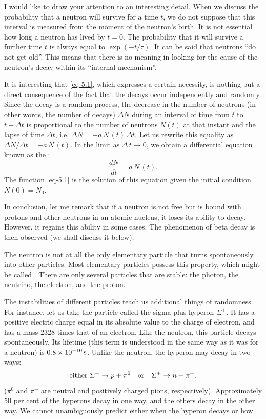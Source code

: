 I would like to draw your attention to an interesting detail. When we
discuss the probability that a neutron will survive for a time $t$, we do
not suppose that this interval is measured from the moment of the
neutron's birth. It is not essential how long a neutron has lived by $t = 0$.
The probability that it will survive a further time $t$ is always equal to
$\exp  (-t / \tau)$. It can be said that neutrons ``do not get old''. This means that there is no meaning in looking for the cause of the neutron's decay
within its ``internal mechanism''.

It is interesting that \eqref{eq-5.1}, which expresses a certain necessity, is
nothing but a direct consequence of the fact that the decays occur
independently and randomly. Since the decay is a random process, the
decrease in the number of neutrons (in other words, the number of
decays) $\Delta N$ during an interval of time from $t$ to $t + \Delta t$ is proportional to the number of neutrons $N (t)$ at that instant and the lapse of time $\Delta t$, i.e. $ \Delta N = - a \, N \, (t) \, \Delta t$. Let us rewrite this equality as   $ \Delta N / \Delta t  = - a \, N \, (t)$. In the
limit as $ \Delta \, t \to 0$, we obtain a differential equation known as the :
\begin{equation}%
\frac{dN}{dt} = a \, N \, (t).
\label{eq-5.2}
\end{equation}
The function \eqref{eq-5.1} is the solution of this equation given the initial condition $N (0) = N_{0}$.

In conclusion, let me remark that if a neutron is not free but is bound
with protons and other neutrons in an atomic nucleus, it loses its ability
to decay. However, it regains this ability in some cases. The
phenomenon of beta decay is then observed (we shall discuss it below).

 The neutron is not at all the only elementary particle that turns spontaneously into other particles.
Most elementary particles possess this property, which might be called
. There are only several particles that are stable: the photon, the neutrino, the electron, and the proton.

The instabilities of different particles teach us additional things of
randomness. For instance, let us take the particle called the sigma-plus-hyperon $\Sigma^{+}$. It has a positive electric charge equal in its absolute value to the charge of electron, and has a mass 2328 times that of an electron. Like the neutron, this particle decays spontaneously. Its lifetime (this term is understood in the same way as it was for a neutron) is $0.8 \times \SI{d-10}{\second}$. Unlike the neutron, the hyperon may decay in two ways: 
\begin{equation*}%
\text{either} \,\,  \Sigma^{+} \to p + \pi^{0}  \qor  \Sigma^{+} \to n + \pi^{+}.
\end{equation*}
($\pi^{0}$ and $\pi^{+}$ are neutral and positively charged pions, respectively).  Approximately 50 per cent of the hyperons decay in one way, and the others decay in the other way. We cannot unambiguously predict either when the hyperon decays or how.

